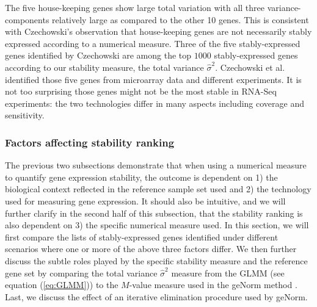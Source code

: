 	
	The five house-keeping genes show large total variation with all three
	variance-components relatively large as compared to the other 10 genes. This is
	consistent with Czechowski's observation that house-keeping genes are not necessarily stably
	expressed according to a numerical measure. Three of the five
	stably-expressed genes identified by Czechowski are among the top $1000$
	stably-expressed genes according to our stability measure, the total variance $\hat\sigma^2$. 
	Czechowski et al.
	identified those five genes from microarray data and different experiments. It
	is not too surprising those genes might not be the most stable in RNA-Seq
	experiments: the two technologies differ in many aspects including coverage
	and sensitivity. 
	
	
	\subsubsection{Factors affecting stability ranking}\label{section:stabilityMeasure}
	The previous two subsections demonstrate that when using a numerical measure
	to quantify gene expression stability, the outcome is dependent on 1) the
	biological context reflected in the reference sample set used and 2) the
	technology used for measuring gene expression. It should also be intuitive,
	and we will further clarify in the second half of this subsection, 
	that the stability ranking is also dependent on 3) the specific numerical measure used.
	In this section, we will first compare the lists of stably-expressed genes
	identified under different scenarios where one or more of the above three
	factors differ.  We then further discuss the subtle roles played by the
	specific stability measure and the reference gene set by comparing the total
	variance $\hat\sigma^2$ measure from the GLMM (see equation (\ref{eq:GLMM}))
	to the $M$-value measure used in the geNorm method \citep{vandesompele2002accurate}.
	Last, we discuss the effect of an iterative elimination procedure used by
	geNorm.
	
